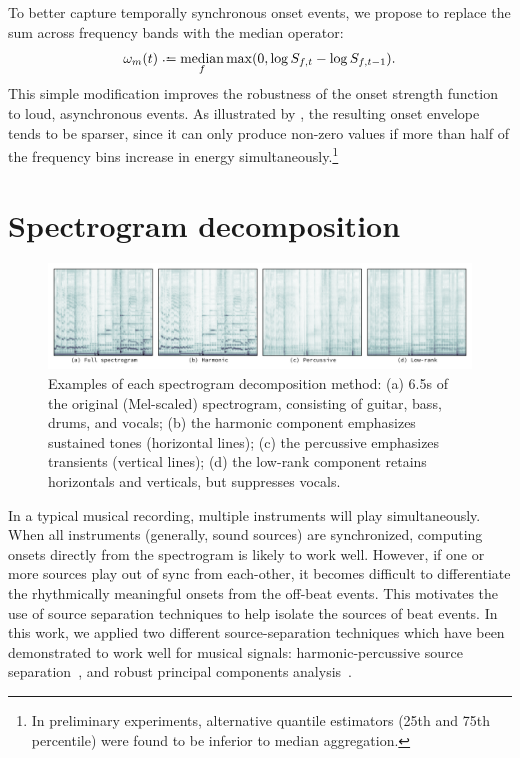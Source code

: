 \documentclass{article}
\begin{document}
To better capture temporally synchronous onset events, we propose to replace the sum
across frequency bands with the median operator:
\begin{equation}
\omega_m(t) \defeq \median_f \max(0, \log S_{f, t} - \log S_{f, t-1}).\label{eq:onset:median}
\end{equation}
This simple modification improves the robustness of the onset strength function to loud, 
asynchronous events.  As illustrated by , the resulting onset envelope tends 
to be sparser, since it can only produce non-zero values if more than half of the frequency 
bins increase in energy simultaneously.\footnote{In preliminary experiments, alternative quantile estimators 
(25th and 75th percentile) were found to be inferior to median aggregation.}

\section{Spectrogram decomposition}
\label{sec:spectrogram}

\begin{figure}
\centering%
\includegraphics[width=\textwidth]{figs/specgrams}%
\vspace{-\baselineskip}%
\caption{Examples of each spectrogram decomposition method: 
(a) 6.5s of the original (Mel-scaled) spectrogram, consisting of guitar, bass, drums, and vocals; 
(b) the harmonic component emphasizes sustained tones (horizontal lines); 
(c) the percussive emphasizes transients (vertical lines); 
(d) the low-rank component retains horizontals and verticals, but suppresses vocals.}
\label{fig:specgrams}
\end{figure}

In a typical musical recording, multiple instruments will play simultaneously. When
all instruments (generally, sound sources) are synchronized, computing onsets
directly from the spectrogram is likely to work well.  
However, if one or more sources play out of sync from each-other, it becomes difficult
to differentiate the rhythmically meaningful onsets from the off-beat events.  This
motivates the use of source separation techniques to help isolate the sources of beat
events.  In this work, we applied two different source-separation techniques which have
been demonstrated to work well for musical signals: harmonic-percussive source 
separation~\cite{ono2008real}, and robust principal components analysis~\cite{candes2011robust}.
\end{document}

